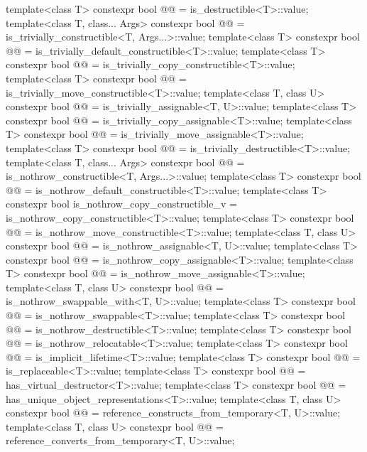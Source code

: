 \begin{codeblock}
{  template<class T>
    constexpr bool @@ = is_destructible<T>::value;
  template<class T, class... Args>
    constexpr bool @@ = is_trivially_constructible<T, Args...>::value;
  template<class T>
    constexpr bool @@
      = is_trivially_default_constructible<T>::value;
  template<class T>
    constexpr bool @@ = is_trivially_copy_constructible<T>::value;
  template<class T>
    constexpr bool @@ = is_trivially_move_constructible<T>::value;
  template<class T, class U>
    constexpr bool @@ = is_trivially_assignable<T, U>::value;
  template<class T>
    constexpr bool @@ = is_trivially_copy_assignable<T>::value;
  template<class T>
    constexpr bool @@ = is_trivially_move_assignable<T>::value;
  template<class T>
    constexpr bool @@ = is_trivially_destructible<T>::value;
  template<class T, class... Args>
    constexpr bool @@ = is_nothrow_constructible<T, Args...>::value;
  template<class T>
    constexpr bool @@
      = is_nothrow_default_constructible<T>::value;
  template<class T>
    constexpr bool is_nothrow_copy_constructible_v = is_nothrow_copy_constructible<T>::value;
  template<class T>
    constexpr bool @@ = is_nothrow_move_constructible<T>::value;
  template<class T, class U>
    constexpr bool @@ = is_nothrow_assignable<T, U>::value;
  template<class T>
    constexpr bool @@ = is_nothrow_copy_assignable<T>::value;
  template<class T>
    constexpr bool @@ = is_nothrow_move_assignable<T>::value;
  template<class T, class U>
    constexpr bool @@ = is_nothrow_swappable_with<T, U>::value;
  template<class T>
    constexpr bool @@ = is_nothrow_swappable<T>::value;
  template<class T>
    constexpr bool @@ = is_nothrow_destructible<T>::value;
  template<class T>
    constexpr bool @@ = is_nothrow_relocatable<T>::value;
  template<class T>
    constexpr bool @@ = is_implicit_lifetime<T>::value;
  template<class T>
    constexpr bool @@ = is_replaceable<T>::value;
  template<class T>
    constexpr bool @@ = has_virtual_destructor<T>::value;
  template<class T>
    constexpr bool @@
      = has_unique_object_representations<T>::value;
  template<class T, class U>
    constexpr bool @@
      = reference_constructs_from_temporary<T, U>::value;
  template<class T, class U>
    constexpr bool @@
      = reference_converts_from_temporary<T, U>::value;

}
\end{codeblock}
